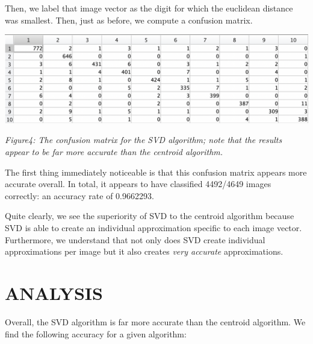 \documentclass[dvipsnames,12pt]{article} %
\begin{document}
        \hskip 12pt Then, we label that image vector as the digit for which the euclidean distance was smallest. Then, just as before, we compute a confusion matrix.

        \begin{center}
            \includegraphics[scale = 0.65]{Images/MAT 167 FPP Fig 4.png}

            \textit{Figure4: The confusion matrix for the SVD algorithm; note that the results appear to be far more accurate than the centroid algorithm.}
        \end{center}

        \vskip 06pt

        \hskip 12pt The first thing immediately noticeable is that this confusion matrix appears more accurate overall. In total, it appears to have classified 4492/4649 images correctly: an accuracy rate of 0.9662293.

        \vskip 06pt

        \hskip 12pt Quite clearly, we see the superiority of SVD to the centroid algorithm because SVD is able to create an individual approximation specific to each image vector. Furthermore, we understand that not only does SVD create individual approximations per image but it also creates \textit{very accurate} approximations.

      \section{ANALYSIS}
        \label{SECT 05:ANALYSIS}

    \hskip 12pt Overall, the SVD algorithm is far more accurate than the centroid algorithm. We find the following accuracy for a given algorithm:
\end{document}
